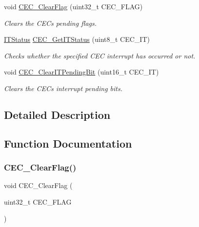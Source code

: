 \begin{DoxyCompactItemize}
void \hyperlink{group___c_e_c___private___functions_ga928b373fb5972204c56f9c64113f8c67}{C\+E\+C\+\_\+\+Clear\+Flag} (uint32\+\_\+t C\+E\+C\+\_\+\+F\+L\+AG)
\begin{DoxyCompactList}\small\item\em Clears the C\+EC\textquotesingle{}s pending flags. \end{DoxyCompactList}\item 
\hyperlink{group___exported__types_gaacbd7ed539db0aacd973a0f6eca34074}{I\+T\+Status} \hyperlink{group___c_e_c___private___functions_gaa1940a388d0bfcefe7483fb74cc2ba1d}{C\+E\+C\+\_\+\+Get\+I\+T\+Status} (uint8\+\_\+t C\+E\+C\+\_\+\+IT)
\begin{DoxyCompactList}\small\item\em Checks whether the specified C\+EC interrupt has occurred or not. \end{DoxyCompactList}\item 
void \hyperlink{group___c_e_c___private___functions_gade646921262a077172c708953822f248}{C\+E\+C\+\_\+\+Clear\+I\+T\+Pending\+Bit} (uint16\+\_\+t C\+E\+C\+\_\+\+IT)
\begin{DoxyCompactList}\small\item\em Clears the C\+EC\textquotesingle{}s interrupt pending bits. \end{DoxyCompactList}\end{DoxyCompactItemize}


\subsection{Detailed Description}


\subsection{Function Documentation}
\mbox{\label{group___c_e_c___private___functions_ga928b373fb5972204c56f9c64113f8c67}} 
\subsubsection{\texorpdfstring{C\+E\+C\+\_\+\+Clear\+Flag()}{CEC\_ClearFlag()}}
{\footnotesize\ttfamily void C\+E\+C\+\_\+\+Clear\+Flag (\begin{DoxyParamCaption}\item[{uint32\+\_\+t}]{C\+E\+C\+\_\+\+F\+L\+AG }\end{DoxyParamCaption})}



